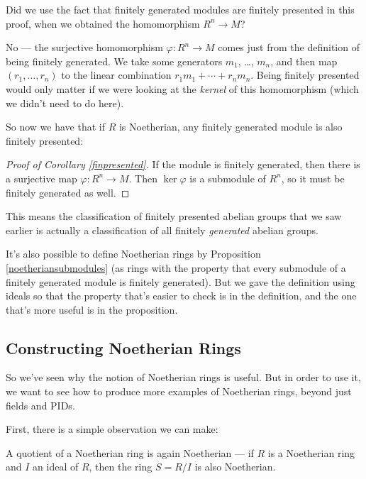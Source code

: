\begin{question}
Did we use the fact that finitely generated modules are finitely presented in this proof, when we obtained the homomorphism $R^n \to M$?
\end{question}

\begin{ans}
No --- the surjective homomorphism $\varphi : R^n \to M$ comes just from the definition of being finitely generated. We take some generators $m_1$, \ldots, $m_n$, and then map $(r_1, \ldots, r_n)$ to the linear combination $r_1m_1 + \cdots + r_nm_n$. Being finitely presented would only matter if we were looking at the \emph{kernel} of this homomorphism (which we didn't need to do here). 
\end{ans}

So now we have that if $R$ is Noetherian, any finitely generated module is also finitely presented:

\begin{proof}[Proof of Corollary \ref{finpresented}]
    If the module is finitely generated, then there is a surjective map $\varphi : R^n \to M$. Then $\ker\varphi$ is a submodule of $R^n$, so it must be finitely generated as well. 
\end{proof}

This means the classification of finitely presented abelian groups that we saw earlier is actually a classification of all finitely \emph{generated} abelian groups. 

\begin{note}
It's also possible to define Noetherian rings by Proposition \ref{noetheriansubmodules} (as rings with the property that every submodule of a finitely generated module is finitely generated). But we gave the definition using ideals so that the property that's easier to check is in the definition, and the one that's more useful is in the proposition. 
\end{note}

\subsection{Constructing Noetherian Rings}

So we've seen why the notion of Noetherian rings is useful. But in order to use it, we want to see how to produce more examples of Noetherian rings, beyond just fields and PIDs. 

First, there is a simple observation we can make:

\begin{lemma}
    A quotient of a Noetherian ring is again Noetherian --- if $R$ is a Noetherian ring and $I$ an ideal of $R$, then the ring $S = R/I$ is also Noetherian. 
\end{lemma}

